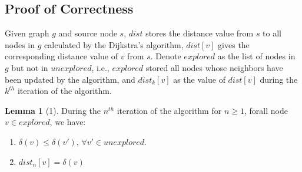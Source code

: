 \documentclass[11pt, oneside]{article}   	%
\theoremstyle{definition}
\newtheorem*{lemma}{Lemma}
\begin{document}
\subsection{Proof of Correctness}
Given graph $g$ and source node $s$, $dist$ stores the distance value from $s$ to all nodes in $g$ calculated by the Dijkstra's algorithm, $dist[v]$ gives the corresponding distance value of $v$ from $s$. Denote $explored$ as the list of nodes in $g$ but not in $unexplored$, i.e., $explored$ stored all nodes whose neighbors have been updated by the algorithm, and $dist_{k}[v]$ as the value of $dist[v]$ during the $k^{th}$ iteration of the algorithm. 
\newpage
\begin{lemma}
[1] During the $n^{th}$ iteration of the algorithm for $n \geq 1$, forall node $v \in explored$, we have:
\begin{enumerate}
  \item $\delta(v) \leq \delta(v')$, $\forall v' \in unexplored$.
  \item $dist_n[v] = \delta(v)$
\end{enumerate}
\end{lemma}
\end{document}
